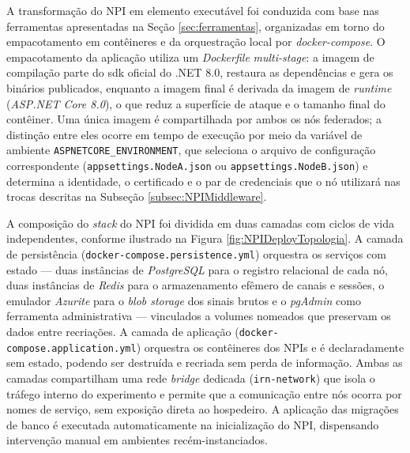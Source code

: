 A transformação do NPI em elemento executável foi conduzida com base nas ferramentas apresentadas na Seção \ref{sec:ferramentas}, organizadas em torno do empacotamento em contêineres e da orquestração local por \textit{docker-compose}. O empacotamento da aplicação utiliza um \textit{Dockerfile} \textit{multi-stage}: a imagem de compilação parte do \gls{sdk} oficial do .NET 8.0, restaura as dependências e gera os binários publicados, enquanto a imagem final é derivada da imagem de \textit{runtime} (\textit{ASP.NET Core 8.0}), o que reduz a superfície de ataque e o tamanho final do contêiner. Uma única imagem é compartilhada por ambos os nós federados; a distinção entre eles ocorre em tempo de execução por meio da variável de ambiente \texttt{ASPNETCORE\_ENVIRONMENT}, que seleciona o arquivo de configuração correspondente (\texttt{appsettings.NodeA.json} ou \texttt{appsettings.NodeB.json}) e determina a identidade, o certificado e o par de credenciais que o nó utilizará nas trocas descritas na Subseção \ref{subsec:NPIMiddleware}. 


A composição do \textit{stack} do NPI foi dividida em duas camadas com ciclos de vida independentes, conforme ilustrado na Figura \ref{fig:NPIDeployTopologia}. A camada de persistência (\texttt{docker-compose.persistence.yml}) orquestra os serviços com estado --- duas instâncias de \textit{PostgreSQL} para o registro relacional de cada nó, duas instâncias de \textit{Redis} para o armazenamento efêmero de canais e sessões, o emulador \textit{Azurite} para o \textit{blob storage} dos sinais brutos e o \textit{pgAdmin} como ferramenta administrativa --- vinculados a volumes nomeados que preservam os dados entre recriações. A camada de aplicação (\texttt{docker-compose.application.yml}) orquestra os contêineres dos NPIs e é declaradamente sem estado, podendo ser destruída e recriada sem perda de informação. Ambas as camadas compartilham uma rede \textit{bridge} dedicada (\texttt{irn-network}) que isola o tráfego interno do experimento e permite que a comunicação entre nós ocorra por nomes de serviço, sem exposição direta ao hospedeiro. A aplicação das migrações de banco é executada automaticamente na inicialização do NPI, dispensando intervenção manual em ambientes recém-instanciados.

